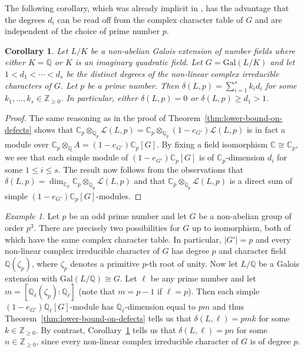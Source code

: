 \documentclass[12pt]{amsart}
\theoremstyle{plain}
\newtheorem{corollary}[theorem]{Corollary}
\theoremstyle{remark}
\newtheorem{example}[theorem]{Example}
\theoremstyle{definition}
\newcommand{\Z}{\mathbb{Z}}
\newcommand{\Q}{\mathbb{Q}}
\newcommand{\C}{\mathbb{C}}
\newcommand{\Gal}{\mathrm{Gal}}
\numberwithin{equation}{section}
\begin{document}
The following corollary, which was already implicit in \cite{MR659620,MR769790,MR1004134,MR1087978},
has the advantage that the degrees $d_{i}$ can be read off from the complex character table of $G$ and are independent of the choice of prime number $p$.

\begin{corollary}\label{cor:lower-bound-on-defects}
Let $L/K$ be a non-abelian Galois extension of number fields where either $K=\Q$ 
or $K$ is an imaginary quadratic field.
Let $G=\Gal(L/K)$ and let $1 < d_{1} < \cdots < d_{s}$ be the distinct degrees of the non-linear complex irreducible characters of $G$.
Let $p$ be a prime number. 
Then $\delta(L,p)=\sum_{i=1}^{s} k_{i}d_{i}$ for some $k_{1}, \ldots, k_{s} \in \Z_{\geq 0}$.
In particular, either $\delta(L,p)=0$ or $\delta(L,p) \geq d_{1}>1$.
\end{corollary}

\begin{proof}
The same reasoning as in the proof of Theorem~\ref{thm:lower-bound-on-defects} shows that 
$\C_{p} \otimes_{\Q_{p}} \mathcal{L}(L,p) = \C_{p} \otimes_{\Q_{p}} (1-e_{G'}) \mathcal{L}(L,p)$ 
is in fact a module over $\C_{p} \otimes_{\Q} A = (1-e_{G'})\C_{p}[G]$.
By fixing a field isomorphism $\C \cong \C_{p}$, we see that each simple module
of $(1-e_{G'})\C_{p}[G]$ is of $\C_{p}$-dimension $d_{i}$ for some $1 \leq i \leq s$.
The result now follows from the observations that 
$\delta(L,p) = \dim_{\C_{p}} \C_{p} \otimes_{\Q_{p}} \mathcal{L}(L,p)$ and that 
$\C_{p} \otimes_{\Q_{p}} \mathcal{L}(L,p)$ is a direct sum of simple  $(1-e_{G'})\C_{p}[G]$-modules.
\end{proof}

\begin{example}
Let $p$ be an odd prime number and let $G$ be a non-abelian group of order $p^{3}$. 
There are precisely two possibilities for $G$ up to isomorphism, 
both of which have the same complex character table. 
In particular, $|G'|=p$ and every non-linear complex irreducible character of $G$ has degree
$p$ and character field $\Q(\zeta_{p})$, where $\zeta_{p}$ denotes a primitive $p$-th  root of unity. 
Now let $L/\Q$ be a Galois extension with $\Gal(L/\Q) \cong G$. 
Let $\ell$ be any prime number and let $m=[\Q_{\ell}(\zeta_{p}):\Q_{\ell}]$
(note that $m=p-1$ if $\ell=p$).
Then each simple $(1-e_{G'})\Q_{\ell}[G]$-module has $\Q_{\ell}$-dimension equal to 
$pm$ and thus 
Theorem~\ref{thm:lower-bound-on-defects} tells us that $\delta(L,\ell)=pmk$ for some $k \in \Z_{\geq 0}$.
By contrast, Corollary~\ref{cor:lower-bound-on-defects} tells us that $\delta(L,\ell)=pn$ for some $n \in \Z_{\geq 0}$,
since every non-linear complex irreducible character of $G$ is of degree $p$.
\end{example}
\end{document}
